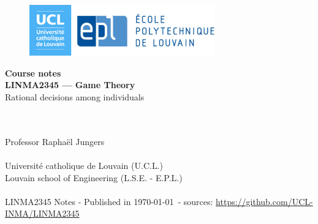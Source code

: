 \ifx \globalmark \undefined %

\else 	
\fi



\begin{titlepage}
\begin{center}



\vfill

\begin{figure}[!ht]
\centering
\includegraphics[width = 8cm]{Logo_UCL-EPL.eps}
\end{figure}







{ \bfseries Course notes }
\hrulefill\\[0.5cm]
\large{\textbf{LINMA2345 --- Game Theory}\\
Rational decisions among individuals} \\
\hrulefill\\[0.5cm]

\end{center}
\vfill
\vfill

	



$\,$\\
Professor  Rapha\"el Jungers \\
$\,$\\
Universit\'e catholique de Louvain (U.C.L.)\\
Louvain school of Engineering (L.S.E. - E.P.L.)\\
$\,$\\
\tiny{LINMA2345 Notes - Published in \monthyeardate\today $\,$ - sources: \url{https://github.com/UCL-INMA/LINMA2345}}


\end{titlepage}







